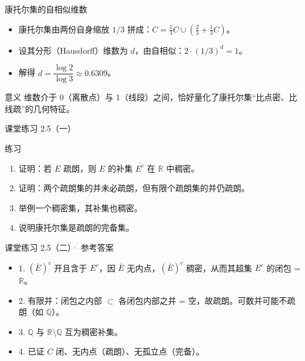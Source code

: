 \documentclass[aspectratio=169,11pt]{ctexbeamer}
\begin{document}
\begin{frame}{康托尔集的自相似维数}
  \begin{itemize}
    \item 康托尔集由两份自身缩放 $1/3$ 拼成：$C=\tfrac13 C\cup(\tfrac23+\tfrac13 C)$。
    \item 设其分形（Hausdorff）维数为 $d$，由自相似：$2\cdot(1/3)^{d}=1$。
    \item 解得 $d=\dfrac{\log 2}{\log 3}\approx0.6309$。
  \end{itemize}
  \begin{block}{意义}
    维数介于 0（离散点）与 1（线段）之间，恰好量化了康托尔集“比点密、比线疏”的几何特征。
  \end{block}
\end{frame}

\begin{frame}{课堂练习 2.5（一）}
  \begin{block}{练习}
    \begin{enumerate}
      \item 证明：若 $E$ 疏朗，则 $E$ 的补集 $\overline{E^{c}}$ 在 $\mathbb{R}$ 中稠密。
      \item 证明：两个疏朗集的并未必疏朗，但有限个疏朗集的并仍疏朗。
      \item 举例一个稠密集，其补集也稠密。
      \item 说明康托尔集是疏朗的完备集。
    \end{enumerate}
  \end{block}
\end{frame}

\begin{frame}{课堂练习 2.5（二）· 参考答案}
  \begin{itemize}
    \item 1. $(\overline{E})^{c}$ 开且含于 $E^{c}$，因 $\overline{E}$ 无内点，$(\overline{E})^{c}$ 稠密，从而其超集 $E^{c}$ 的闭包 = $\mathbb{R}$。
    \item 2. 有限并：闭包之内部 $\subset$ 各闭包内部之并 = 空，故疏朗。可数并可能不疏朗（如 $\mathbb{Q}$）。
    \item 3. $\mathbb{Q}$ 与 $\mathbb{R}\setminus\mathbb{Q}$ 互为稠密补集。
    \item 4. 已证 $C$ 闭、无内点（疏朗）、无孤立点（完备）。
  \end{itemize}
\end{frame}
\end{document}
